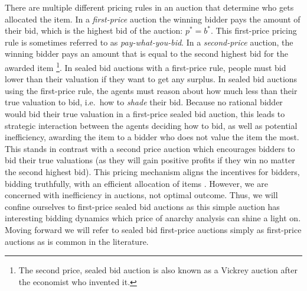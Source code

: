 \documentclass[12pt,twoside]{reedthesis}
\begin{document}
There are multiple different pricing rules in an auction that determine who gets allocated the item. In a {\em first-price} auction the winning bidder pays the amount of their bid, which is the highest bid of the auction: $p^* = b^*$. This first-price pricing rule is sometimes referred to as {\em pay-what-you-bid}. In a {\em second-price} auction, the winning bidder pays an amount that is equal to the second highest bid for the awarded item \citep{Vickrey1961} \footnote{The second price, sealed bid auction is also known as a Vickrey auction after the economist who invented it.}. In sealed bid auctions with a first-price rule, people must bid lower than their valuation if they want to get any surplus. In sealed bid auctions using the first-price rule, the agents must reason about how much less than their true valuation to bid, i.e.~how to {\em shade} their bid. Because no rational bidder would bid their true valuation in a first-price sealed bid auction, this leads to strategic interaction between the agents deciding how to bid, as well as potential inefficiency, awarding the item to a bidder who does not value the item the most. This stands in contrast with a second price auction which encourages bidders to bid their true valuations (as they will gain positive profits if they win no matter the second highest bid). This pricing mechanism aligns the incentives for bidders, bidding truthfully, with an efficient allocation of items \citep{Mochon2015}. However, we are concerned with inefficiency in auctions, not optimal outcome. Thus, we will confine ourselves to first-price sealed bid auctions as this simple auction has interesting bidding dynamics which price of anarchy analysis can shine a light on. Moving forward we will refer to sealed bid first-price auctions simply as first-price auctions as is common in the literature. 
\end{document}
